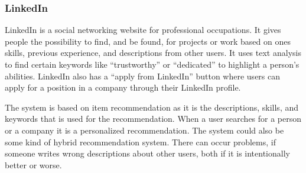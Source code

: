 \subsubsection{LinkedIn}

LinkedIn is a social networking website for professional occupations. It gives people the possibility to find, and be found, for projects or work based on ones skills, previous experience, and descriptions from other users. It uses text analysis to find certain keywords like “trustworthy” or “dedicated” to highlight a person's abilities. LinkedIn also has a “apply from LinkedIn” button where users can apply for a position in a company through their LinkedIn profile. 

The system is based on item recommendation as it is the descriptions, skills, and keywords that is used for the recommendation. When a user searches for a person or a company it is a personalized recommendation. The system could also be some kind of hybrid recommendation system. There can occur problems, if someone writes wrong descriptions about other users, both if it is intentionally better or worse.